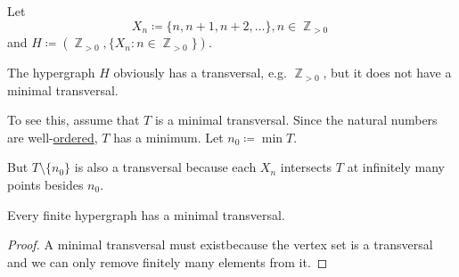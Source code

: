 \begin{example}\label{ex:no_minimal_set_transversal}
  Let
  \begin{equation*}
    X_n \coloneqq \{ n, n + 1, n + 2, \ldots \}, n \in \BbbZ_{>0}
  \end{equation*}
  and \( H \coloneqq (\BbbZ_{>0}, \{ X_n \colon n \in \BbbZ_{>0} \}) \).

  The hypergraph \( H \) obviously has a transversal, e.g. \( \BbbZ_{>0} \), but it does not have a minimal transversal.

  To see this, assume that \( T \) is a minimal transversal. Since the natural numbers are well-\hyperref[thm:natural_numbers_are_well_ordered]{ordered}, \( T \) has a minimum. Let \( n_0 \coloneqq \min T \).

  But \( T \setminus \{ n_0 \} \) is also a transversal because each \( X_n \) intersects \( T \) at infinitely many points besides \( n_0 \).
\end{example}

\begin{proposition}\label{thm:finite_hypergraphs_have_minimal_transversal}
  Every finite hypergraph has a minimal transversal.
\end{proposition}
\begin{proof}
  A minimal transversal must exist\LEM because the vertex set is a transversal and we can only remove finitely many elements from it.
\end{proof}
